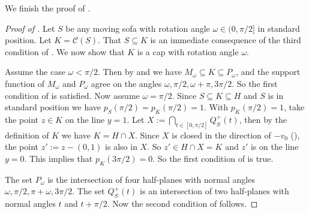 We finish the proof of .

\begin{proof}[Proof of ]
Let \(S\) be any moving sofa with rotation angle \(\omega \in (0, \pi/2]\) in standard position. Let \(K = \mathcal{C}(S)\). That \(S \subseteq K\) is an immediate consequence of the third condition of . We now show that \(K\) is a cap with rotation angle \(\omega\).

Assume the case \(\omega < \pi/2\). Then by  and  we have \(M_\omega \subseteq K \subseteq P_\omega\), and the support function of \(M_\omega\) and \(P_\omega\) agree on the angles \(\omega, \pi/2, \omega + \pi, 3\pi/2\). So the first condition of  is satisfied. Now assume \(\omega = \pi/2\). Since \(S \subseteq K \subseteq H\) and \(S\) is in standard position we have \(p_S(\pi/2) = p_K(\pi/2) = 1\). With \(p_K(\pi/2) = 1\), take the point \(z \in K\) on the line \(y=1\). Let \(X := \bigcap_{t \in [0, \pi/2]} Q_S^+(t)\), then by the definition of \(K\) we have \(K = H \cap X\). Since \(X\) is closed in the direction of \(-v_0\) (), the point \(z' := z - (0, 1)\) is also in \(X\). So \(z' \in H \cap X = K\) and \(z'\) is on the line \(y=0\). This implies that \(p_K(3\pi/2) = 0\). So the first condition of  is true.

The set \(P_\omega\) is the intersection of four half-planes with normal angles \(\omega, \pi/2, \pi + \omega, 3\pi/2\). The set \(Q_S^+(t)\) is an intersection of two half-planes with normal angles \(t\) and \(t + \pi/2\). Now the second condition of  follows.
\end{proof}